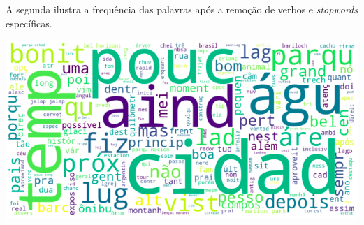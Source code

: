 \vspace{3mm} %

A segunda ilustra a frequência das palavras após a remoção de verbos e \textit{stopwords} específicas.

\vspace{3mm} %

\includegraphics[scale=0.5]{explore/resources/nuvem_palavras_sem_verbos_sw.png}
